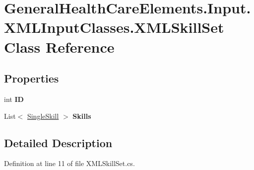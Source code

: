 \hypertarget{class_general_health_care_elements_1_1_input_1_1_x_m_l_input_classes_1_1_x_m_l_skill_set}{}\section{General\+Health\+Care\+Elements.\+Input.\+X\+M\+L\+Input\+Classes.\+X\+M\+L\+Skill\+Set Class Reference}
\label{class_general_health_care_elements_1_1_input_1_1_x_m_l_input_classes_1_1_x_m_l_skill_set}
\subsection*{Properties}
\begin{DoxyCompactItemize}
\item 
int {\bfseries ID}\hypertarget{class_general_health_care_elements_1_1_input_1_1_x_m_l_input_classes_1_1_x_m_l_skill_set_a26309215e295a081aeec35c9cd253f2c}{}\label{class_general_health_care_elements_1_1_input_1_1_x_m_l_input_classes_1_1_x_m_l_skill_set_a26309215e295a081aeec35c9cd253f2c}

\item 
List$<$ \hyperlink{class_simulation_core_1_1_h_c_c_m_elements_1_1_single_skill}{Single\+Skill} $>$ {\bfseries Skills}\hypertarget{class_general_health_care_elements_1_1_input_1_1_x_m_l_input_classes_1_1_x_m_l_skill_set_a05427ae006f9a2f4c2d4c0113de7ad28}{}\label{class_general_health_care_elements_1_1_input_1_1_x_m_l_input_classes_1_1_x_m_l_skill_set_a05427ae006f9a2f4c2d4c0113de7ad28}

\end{DoxyCompactItemize}


\subsection{Detailed Description}


Definition at line 11 of file X\+M\+L\+Skill\+Set.\+cs.

